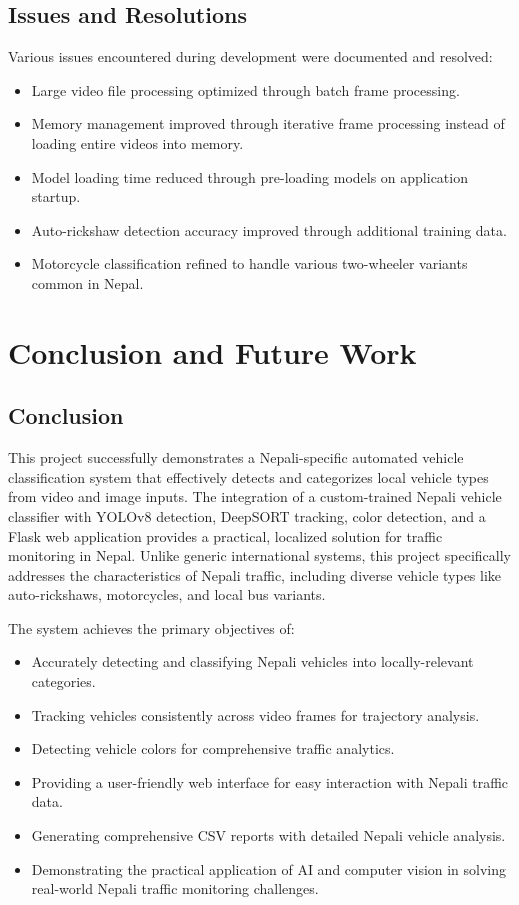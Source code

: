 \documentclass[12pt,a4paper]{report}
\begin{document}
\section{Issues and Resolutions}
Various issues encountered during development were documented and resolved:
\begin{itemize}
    \item Large video file processing optimized through batch frame processing.
    \item Memory management improved through iterative frame processing instead of loading entire videos into memory.
    \item Model loading time reduced through pre-loading models on application startup.
    \item Auto-rickshaw detection accuracy improved through additional training data.
    \item Motorcycle classification refined to handle various two-wheeler variants common in Nepal.
\end{itemize}


\chapter{Conclusion and Future Work}

\section{Conclusion}

This project successfully demonstrates a Nepali-specific automated vehicle classification system that effectively detects and categorizes local vehicle types from video and image inputs. The integration of a custom-trained Nepali vehicle classifier with YOLOv8 detection, DeepSORT tracking, color detection, and a Flask web application provides a practical, localized solution for traffic monitoring in Nepal. Unlike generic international systems, this project specifically addresses the characteristics of Nepali traffic, including diverse vehicle types like auto-rickshaws, motorcycles, and local bus variants.

The system achieves the primary objectives of:
\begin{itemize}
    \item Accurately detecting and classifying Nepali vehicles into locally-relevant categories.
    \item Tracking vehicles consistently across video frames for trajectory analysis.
    \item Detecting vehicle colors for comprehensive traffic analytics.
    \item Providing a user-friendly web interface for easy interaction with Nepali traffic data.
    \item Generating comprehensive CSV reports with detailed Nepali vehicle analysis.
    \item Demonstrating the practical application of AI and computer vision in solving real-world Nepali traffic monitoring challenges.
\end{itemize}
\end{document}
